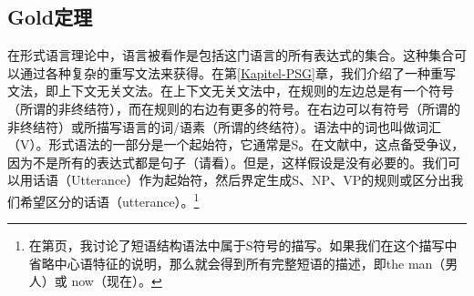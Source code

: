 \subsection{Gold定理}
\label{Abschnitt-Golds-Theorem}

在形式语言理论中，语言被看作是包括这门语言的所有表达式的集合。这种集合可以通过各种复杂的重写文法来获得。在第\ref{Kapitel-PSG}章，我们介绍了一种重写文法，即上下文无关文法。在上下文无关文法中，在规则的左边总是有一个符号（所谓的非终结符），而在规则的右边有更多的符号。在右边可以有符号（所谓的非终结符）或所描写语言的词/语素（所谓的终结符）。语法中的词也叫做词汇（V）。形式语法的一部分是一个起始符，它通常是S。在文献中，这点备受争议，因为不是所有的表达式都是句子（请看\citealp[]{Deppermann2006a}）。但是，这样假设是没有必要的。我们可以用话语（Utterance）作为起始符，然后界定生成S、NP、VP的规则或区分出我们希望区分的话语（utterance）。\footnote{%
在第\pageref{HPSG-Rootnode}页，我讨论了短语结构语法中属于S符号的描写。如果我们在这个描写中省略中心语特征的说明，那么就会得到所有完整短语的描述，即the man（男人）或 now（现在）。
}

